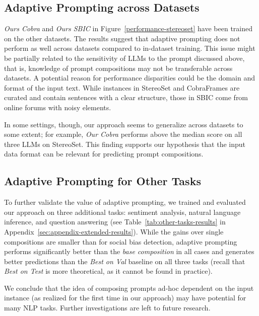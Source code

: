 \subsection{Adaptive Prompting across Datasets}

\emph{Ours Cobra} and \emph{Ours SBIC} in Figure~\ref{performance-stereoset} have been trained on the other datasets. The results  suggest that adaptive prompting does not perform as well across datasets compared to in-dataset training. This issue might be partially related to the sensitivity of LLMs to the prompt discussed above, that is, knowledge of prompt compositions may not be transferable across datasets. A potential reason for performance disparities could be the domain and format of the input text. While instances in StereoSet and CobraFrames are curated and contain sentences with a clear structure, those in SBIC come from online forums with noisy elements.

In some settings, though, our approach seems to generalize across datasets to some extent; for example, \emph{Our Cobra} performs above the median score on all three LLMs on StereoSet. This finding supports our hypothesis that the input data format can be relevant for predicting prompt compositions.

\subsection{Adaptive Prompting for Other Tasks}

To further validate the value of adaptive prompting, we trained and evaluated our approach on three additional tasks: sentiment analysis, natural language inference, and question answering (see Table~\ref{tab:other-tasks-results} in Appendix~\ref{sec:appendix-extended-results}). While the gains over single compositions are smaller than for social bias detection, adaptive prompting performs significantly better than the \emph{base composition} in all cases and generates better predictions than the \emph{Best on Val} baseline on all three tasks (recall that \emph{Best on Test} is more theoretical, as it cannot be found in practice).

We conclude that the idea of composing prompts ad-hoc dependent on the input instance (as realized for the first time in our approach) may have potential for many NLP tasks. Further investigations are left to future research.
